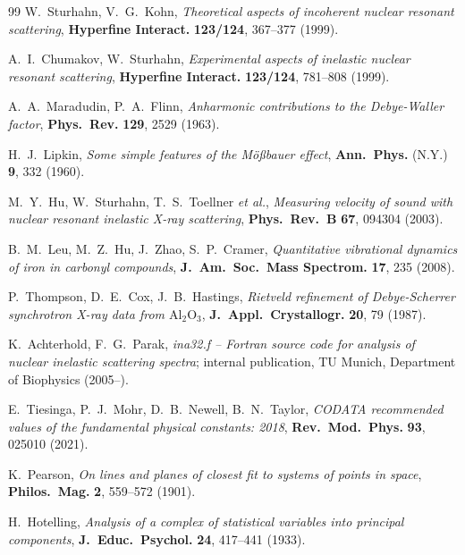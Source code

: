 \documentclass[11pt,a4paper,twoside]{article}
\theoremstyle{remark}
\begin{document}
\begin{thebibliography}{99}
W.~Sturhahn, V.~G.~Kohn,
\emph{Theoretical aspects of incoherent nuclear resonant scattering},
\textbf{Hyperfine Interact.} \textbf{123/124}, 367--377 (1999).

A.~I.~Chumakov, W.~Sturhahn,
\emph{Experimental aspects of inelastic nuclear resonant scattering},
\textbf{Hyperfine Interact.} \textbf{123/124}, 781--808 (1999).

A.~A.~Maradudin, P.~A.~Flinn,
\emph{Anharmonic contributions to the Debye-Waller factor},
\textbf{Phys.\ Rev.} \textbf{129}, 2529 (1963).

H.~J.~Lipkin,
\emph{Some simple features of the M\"o\ss bauer effect},
\textbf{Ann.\ Phys.} (N.Y.) \textbf{9}, 332 (1960).

M.~Y.~Hu, W.~Sturhahn, T.~S.~Toellner \emph{et al.},
\emph{Measuring velocity of sound with nuclear resonant inelastic
X-ray scattering},
\textbf{Phys.\ Rev.\ B} \textbf{67}, 094304 (2003).

B.~M.~Leu, M.~Z.~Hu, J.~Zhao, S.~P.~Cramer,
\emph{Quantitative vibrational dynamics of iron in carbonyl compounds},
\textbf{J.\ Am.\ Soc.\ Mass Spectrom.} \textbf{17}, 235 (2008).

P.~Thompson, D.~E.~Cox, J.~B.~Hastings,
\emph{Rietveld refinement of Debye-Scherrer synchrotron X-ray data
from $\mathrm{Al}_2\mathrm{O}_3$},
\textbf{J.\ Appl.\ Crystallogr.} \textbf{20}, 79 (1987).

K.~Achterhold, F.~G.~Parak,
\emph{ina32.f -- Fortran source code for analysis of nuclear inelastic
scattering spectra}; internal publication, TU Munich, Department of
Biophysics (2005--).

E.~Tiesinga, P.~J.~Mohr, D.~B.~Newell, B.~N.~Taylor,
\emph{CODATA recommended values of the fundamental physical constants:
2018},
\textbf{Rev.\ Mod.\ Phys.} \textbf{93}, 025010 (2021).


K.~Pearson,
\emph{On lines and planes of closest fit to systems of points in space},
\textbf{Philos.\ Mag.} \textbf{2}, 559--572 (1901).

H.~Hotelling,
\emph{Analysis of a complex of statistical variables into principal
components},
\textbf{J.\ Educ.\ Psychol.} \textbf{24}, 417--441 (1933).


\end{thebibliography}
\end{document}
